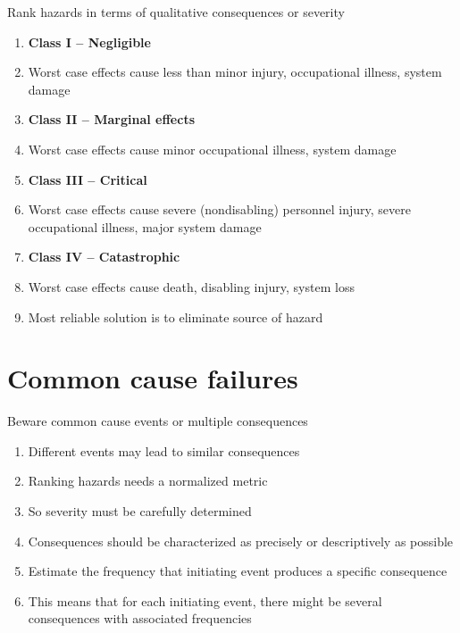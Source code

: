 \documentclass[aspectratio=1610,pdftex,dvipsnames,compress,xcolor={dvipsnames}]{beamer}
\begin{document}
\addtocounter{framenumber}{-1}
\begin{frame}{Rank hazards in terms of qualitative consequences or severity}
    \begin{enumerate}[series=outerlist,topsep=0pt,itemsep=3pt,leftmargin=*,label=(\arabic*)]
        \item[]\textbf{Class I -- Negligible}
        \item[]Worst case effects cause less than minor injury, occupational illness, system damage
            \vspace{0.10in}
        \item[]\textbf{Class II -- Marginal effects}
        \item[]Worst case effects cause minor occupational illness, system damage
            \vspace{0.10in}
        \item[]\textbf{Class III -- Critical}
        \item[]Worst case effects cause severe (nondisabling) personnel injury, severe occupational illness, major system damage
            \vspace{0.10in}
        \item[]\textbf{Class IV -- Catastrophic}
        \item[]Worst case effects cause death, disabling injury, system loss
            \vspace{0.25in}
        \item[]Most reliable solution is to eliminate source of hazard
    \end{enumerate}
\end{frame}


\section{Common cause failures}


\addtocounter{framenumber}{-1}
\begin{frame}{Beware common cause events or multiple consequences}
    \begin{enumerate}[series=outerlist,topsep=0pt,itemsep=21pt,leftmargin=*,label=(\arabic*)]
        \item[]Different events may lead to similar consequences
        \item[]Ranking hazards needs a normalized metric
        \item[]So severity must be carefully determined 
        \item[]Consequences should be characterized as precisely or descriptively as possible 
        \item[]Estimate the frequency that initiating event produces a specific consequence 
        \item[]This means that for each initiating event, there might be several consequences with associated frequencies
    \end{enumerate}
\end{frame}
\end{document}
